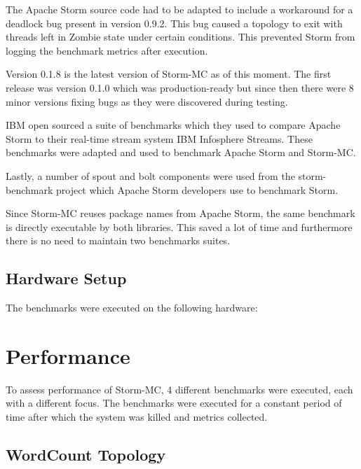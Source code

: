 The Apache Storm source code had to be adapted to include a workaround for a deadlock bug present in version 0.9.2. This bug caused a topology to exit with threads left in Zombie state under certain conditions. This prevented Storm from logging the benchmark metrics after execution.

Version 0.1.8 is the latest version of Storm-MC as of this moment. The first release was version 0.1.0 which was production-ready but since then there were 8 minor versions fixing bugs as they were discovered during testing.

IBM open sourced a suite of benchmarks which they used to compare Apache Storm to their real-time stream system IBM Infosphere Streams. These benchmarks were adapted and used to benchmark Apache Storm and Storm-MC.

Lastly, a number of spout and bolt components were used from the storm-benchmark project which Apache Storm developers use to benchmark Storm.

Since Storm-MC reuses package names from Apache Storm, the same benchmark is directly executable by both libraries. This saved a lot of time and furthermore there is no need to maintain two benchmarks suites.


\subsection{Hardware Setup}

The benchmarks were executed on the following hardware:


\section{Performance}
\label{sec:performance}


To assess performance of Storm-MC, 4 different benchmarks were executed, each with a different focus. The benchmarks were executed for a constant period of time after which the system was killed and metrics collected.

\subsection{WordCount Topology}

